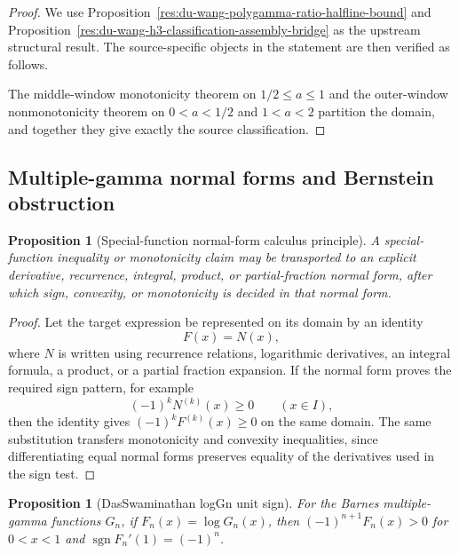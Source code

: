 \documentclass[11pt]{article}
\numberwithin{equation}{section}
\newtheorem{proposition}[theorem]{Proposition}
\theoremstyle{definition}
\theoremstyle{remark}
\newcommand{\1}{\mathbf 1}
\begin{document}
\begin{proof}
We use Proposition~\ref{res:du-wang-polygamma-ratio-halfline-bound} and Proposition~\ref{res:du-wang-h3-classification-assembly-bridge} as the upstream structural result. The source-specific objects in the statement are then verified as follows.

The middle-window monotonicity theorem on \(1/2\le a\le1\) and the outer-window nonmonotonicity theorem on \(0<a<1/2\) and \(1<a<2\) partition the domain, and together they give exactly the source classification.
\end{proof}


\subsection{Multiple-gamma normal forms and Bernstein obstruction}

\begin{proposition}[Special-function normal-form calculus principle]
\label{res:special-function-normal-form-calculus-principle}
A special-function inequality or monotonicity claim may be transported to an explicit derivative, recurrence, integral, product, or partial-fraction normal form, after which sign, convexity, or monotonicity is decided in that normal form.
\end{proposition}

\begin{proof}
Let the target expression be represented on its domain by an identity
\[
F(x)=N(x),
\]
where \(N\) is written using recurrence relations, logarithmic derivatives, an integral formula, a product, or a partial fraction expansion. If the normal form proves the required sign pattern, for example
\[
(-1)^kN^{(k)}(x)\ge0\qquad (x\in I),
\]
then the identity gives \((-1)^kF^{(k)}(x)\ge0\) on the same domain. The same substitution transfers monotonicity and convexity inequalities, since differentiating equal normal forms preserves equality of the derivatives used in the sign test.
\end{proof}

\begin{proposition}[DasSwaminathan logGn unit sign]
\label{res:dasswaminathan-loggn-unit-sign}
For the Barnes multiple-gamma functions \(G_n\), if \(F_n(x)=\log G_n(x)\), then \((-1)^{n+1}F_n(x)>0\) for \(0<x<1\) and \(\operatorname{sgn}F_n'(1)=(-1)^n\).
\end{proposition}
\end{document}
